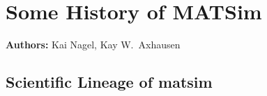 \chapter{Some History of MATSim}
\label{ch:history}

\hfill \textbf{Authors:} Kai Nagel, Kay W.\ Axhausen


%
%


\section{Scientific Lineage of \gls{matsim}}
\label{sec:streams}

